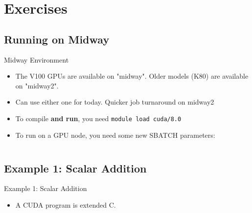 \documentclass{beamer}
\begin{document}
    \section{Exercises}

    \subsection{Running on Midway}

    \begin{frame}{Midway Environment}
        \begin{itemize}
            \item The V100 GPUs are available on "midway".  Older models (K80) are available on "midway2".
            \item Can use either one for today.  Quicker job turnaround on midway2
            \item To compile \textbf{and run}, you need \texttt{module load cuda/8.0}
            \item To run on a GPU node, you need some new SBATCH parameters:
            \begin{block}{}
                \inputminted{bash}{src/midway-gpu.sbatch}
            \end{block}
        \end{itemize}
    \end{frame}

    \subsection{Example 1: Scalar Addition}

    \begin{frame}{Example 1:  Scalar Addition}
        \begin{itemize}
            \item A CUDA program is extended C.
        \end{itemize}
        \begin{block}{}
            \inputminted{cuda}{src/01_scalar_add.cu}
        \end{block}
    \end{frame}
\end{document}
